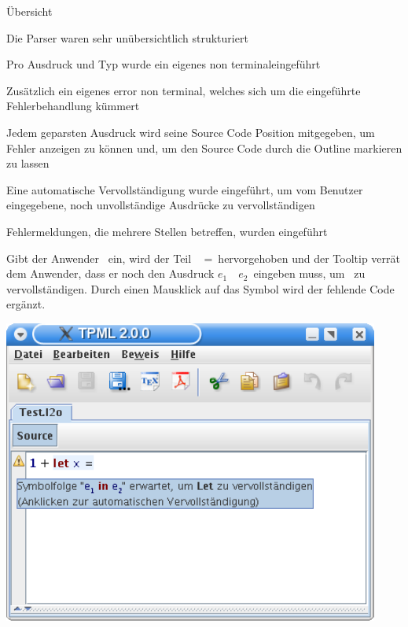 {
  \begin{itemgroup}{Übersicht}
    \item Die Parser waren sehr unübersichtlich strukturiert
    \item Pro Ausdruck und Typ wurde ein eigenes \glqq non terminal\grqq eingeführt
    \item Zusätzlich ein eigenes \glqq error non terminal\grqq, welches sich um
          die eingeführte Fehlerbehandlung kümmert
    \item Jedem geparsten Ausdruck wird seine Source Code Position mitgegeben, um
          Fehler anzeigen zu können und, um den Source Code durch die Outline
          markieren zu lassen
    \item Eine automatische Vervollständigung wurde eingeführt, um vom Benutzer
          eingegebene, noch unvollständige Ausdrücke zu vervollständigen
    \item Fehlermeldungen, die mehrere Stellen betreffen, wurden eingeführt
  \end{itemgroup}
}

{
  Gibt der Anwender \glqq {}\grqq\ 
  ein, wird der Teil \glqq \KeyLet\  =\grqq\ hervorgehoben und der Tooltip
  verrät dem Anwender, dass er noch den Ausdruck \glqq $e_1$\ \KeyIn\ $e_2$\grqq\ eingeben muss,
  um \glqq{\bf Let}\grqq\ zu vervollständigen. Durch einen Mausklick auf das Symbol wird der
  fehlende Code ergänzt.
  \begin{center}
    \includegraphics[height=10cm]{images/parser.png}
  \end{center}
}

